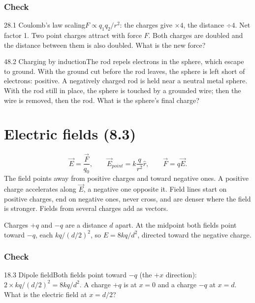 \documentclass[11pt]{article}
\begin{document}
\subsubsection{Check}\mbox{}

\begin{q}{2}{8.1 Coulomb's law scaling}{$F \propto q_1q_2/r^2$: the charges give $\times4$, the distance $\div 4$. Net factor 1.}
Two point charges attract with force $F$. Both charges are doubled and the distance between them is also doubled. What is the new force?
\end{q}
\begin{q}{4}{8.2 Charging by induction}{The rod repels electrons in the sphere, which escape to ground. With the ground cut before the rod leaves, the sphere is left short of electrons: positive.}
A negatively charged rod is held near a neutral metal sphere. With the rod still in place, the sphere is touched by a grounded wire; then the wire is removed, then the rod. What is the sphere's final charge?
\end{q}

\section{Electric fields (8.3)}\label{sec:2}

\[ \vec E = \frac{\vec F}{q_0}, \qquad \vec E_{point} = k\frac{q}{r^2}\hat r, \qquad \vec F = q\vec E. \]
The field points away from positive charges and toward negative ones. A positive charge accelerates along $\vec E$, a negative one opposite it. Field lines start on positive charges, end on negative ones, never cross, and are denser where the field is stronger. Fields from several charges add as vectors.

\begin{example}
Charges $+q$ and $-q$ are a distance $d$ apart. At the midpoint both fields point toward $-q$, each $kq/(d/2)^2$, so $E = 8kq/d^2$, directed toward the negative charge.
\end{example}

\subsubsection{Check}\mbox{}

\begin{q}{1}{8.3 Dipole field}{Both fields point toward $-q$ (the $+x$ direction): $2 \times kq/(d/2)^2 = 8kq/d^2$.}
A charge $+q$ is at $x = 0$ and a charge $-q$ at $x = d$. What is the electric field at $x = d/2$?
\end{q}
\end{document}

